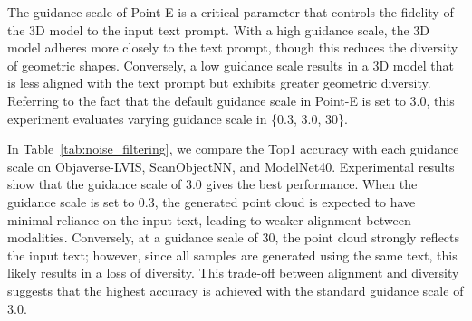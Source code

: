 The guidance scale of Point-E is a critical parameter that controls the fidelity of the 3D model to the input text prompt. With a high guidance scale, the 3D model adheres more closely to the text prompt, though this reduces the diversity of geometric shapes. 
Conversely, a low guidance scale results in a 3D model that is less aligned with the text prompt but exhibits greater geometric diversity. 
Referring to the fact that the default guidance scale in Point-E is set to 3.0, this experiment evaluates varying guidance scale in \{0.3, 3.0, 30\}.

In Table~\ref{tab:noise_filtering}, we compare the Top1 accuracy with each guidance scale on Objaverse-LVIS, ScanObjectNN, and ModelNet40. 
Experimental results show that the guidance scale of 3.0 gives the best performance. 
When the guidance scale is set to 0.3, the generated point cloud is expected to have minimal reliance on the input text, leading to weaker alignment between modalities. Conversely, at a guidance scale of 30, the point cloud strongly reflects the input text; however, since all samples are generated using the same text, this likely results in a loss of diversity. This trade-off between alignment and diversity suggests that the highest accuracy is achieved with the standard guidance scale of 3.0.


